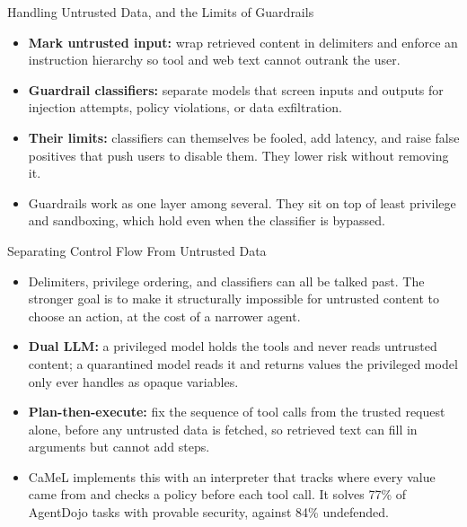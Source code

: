 \begin{frame}{Handling Untrusted Data, and the Limits of Guardrails}
  \begin{itemize}\itemsep0.5em
    \item[\textcolor{KAred}{$\blacktriangleright$}] \textbf{Mark untrusted input:} wrap retrieved content in delimiters and enforce an instruction hierarchy so tool and web text cannot outrank the user.
    \item[\textcolor{KAred}{$\blacktriangleright$}] \textbf{Guardrail classifiers:} separate models that screen inputs and outputs for injection attempts, policy violations, or data exfiltration.
    \item[\textcolor{KAred}{$\blacktriangleright$}] \textbf{Their limits:} classifiers can themselves be fooled, add latency, and raise false positives that push users to disable them. They lower risk without removing it.
    \item[\textcolor{KAred}{$\blacktriangleright$}] Guardrails work as one layer among several. They sit on top of least privilege and sandboxing, which hold even when the classifier is bypassed.
  \end{itemize}
\end{frame}

\begin{frame}{Separating Control Flow From Untrusted Data}
  \begin{itemize}\itemsep0.45em
    \item[\textcolor{KAred}{$\blacktriangleright$}] Delimiters, privilege ordering, and classifiers can all be talked past. The stronger goal is to make it structurally impossible for untrusted content to choose an action, at the cost of a narrower agent.
    \item[\textcolor{KAred}{$\blacktriangleright$}] \textbf{Dual LLM:} a privileged model holds the tools and never reads untrusted content; a quarantined model reads it and returns values the privileged model only ever handles as opaque variables.
    \item[\textcolor{KAred}{$\blacktriangleright$}] \textbf{Plan-then-execute:} fix the sequence of tool calls from the trusted request alone, before any untrusted data is fetched, so retrieved text can fill in arguments but cannot add steps.
    \item[\textcolor{KAred}{$\blacktriangleright$}] CaMeL implements this with an interpreter that tracks where every value came from and checks a policy before each tool call. It solves 77\% of AgentDojo tasks with provable security, against 84\% undefended.
  \end{itemize}
\end{frame}
